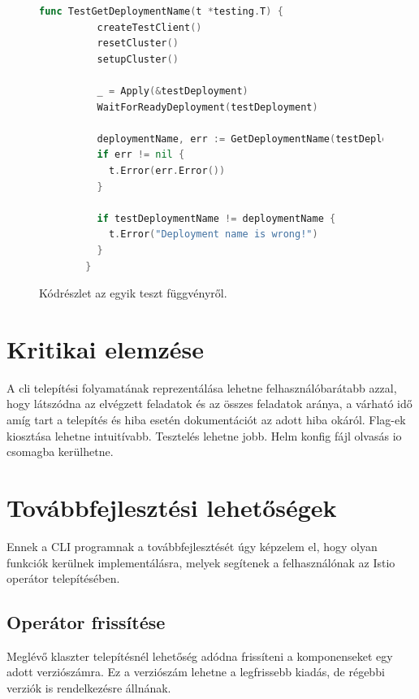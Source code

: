 \begin{figure}
  \centering
  \begin{minipage}{\linewidth}
      \begin{lstlisting}[language=go]
        func TestGetDeploymentName(t *testing.T) {
          createTestClient()
          resetCluster()
          setupCluster()
        
          _ = Apply(&testDeployment)
          WaitForReadyDeployment(testDeployment)
        
          deploymentName, err := GetDeploymentName(testDeploymentReleaseName, testNamespaceName)
          if err != nil {
            t.Error(err.Error())
          }
        
          if testDeploymentName != deploymentName {
            t.Error("Deployment name is wrong!")
          }
        }
      \end{lstlisting}
  \end{minipage}
  \caption{Kódrészlet az egyik teszt függvényről.}
    \label{test-code-snippet}
\end{figure}

\section{Kritikai elemzése}
A cli telepítési folyamatának reprezentálása lehetne felhasználóbarátabb azzal, hogy látszódna az elvégzett feladatok és az összes feladatok aránya, a várható idő amíg tart a telepítés és hiba esetén dokumentációt az adott hiba okáról.
Flag-ek kiosztása lehetne intuitívabb.
Tesztelés lehetne jobb.
Helm konfig fájl olvasás io csomagba kerülhetne.

\section{Továbbfejlesztési lehetőségek}
Ennek a CLI programnak a továbbfejlesztését úgy képzelem el, hogy olyan funkciók kerülnek implementálásra, melyek segítenek a felhasználónak az Istio operátor telepítésében.

\subsection{Operátor frissítése}
Meglévő klaszter telepítésnél lehetőség adódna frissíteni a komponenseket egy adott verziószámra.
Ez a verziószám lehetne a legfrissebb kiadás, de régebbi verziók is rendelkezésre állnának.

